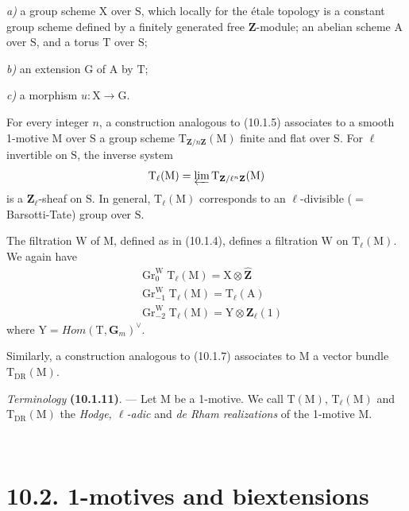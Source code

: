 \documentclass[11pt,leqno]{article}
\newcommand{\Page}[1]{\ifvmode\noindent\else\unskip\ \fi{\footnotesize\textcolor{gray}{[p.\,#1]}}\ \ignorespaces}
\begin{document}
\noindent \textit{a)} a group scheme \(\mathrm{X}\) over
\(\mathrm{S}\), which locally for the étale topology is a constant
group scheme defined by a finitely generated free \(\mathbf{Z}\)-module;
an abelian scheme \(\mathrm{A}\) over \(\mathrm{S}\), and a torus
\(\mathrm{T}\) over \(\mathrm{S}\);\par
\noindent \textit{b)} an extension \(\mathrm{G}\) of \(\mathrm{A}\)
by \(\mathrm{T}\);\par
\noindent \textit{c)} a morphism \(u:\mathrm{X}\to\mathrm{G}\).

For every integer \(n\), a construction analogous to (10.1.5) associates
to a smooth 1-motive \(\mathrm{M}\) over \(\mathrm{S}\) a group
scheme \(\mathrm{T}_{\mathbf{Z}/n\mathbf{Z}}(\mathrm{M})\) finite and
flat over \(\mathrm{S}\). For \(\ell\) invertible on \(\mathrm{S}\),
the inverse system
\[
\mathrm{T}_{\ell}(\mathrm{M})
=\varprojlim\mathrm{T}_{\mathbf{Z}/\ell^n\mathbf{Z}}(\mathrm{M})
\]
is a \(\mathbf{Z}_{\ell}\)-sheaf on \(\mathrm{S}\). In general,
\(\mathrm{T}_{\ell}(\mathrm{M})\) corresponds to an
\(\ell\)-divisible (\(=\) Barsotti-Tate) group over \(\mathrm{S}\).

The filtration \(\mathrm{W}\) of \(\mathrm{M}\), defined as in
(10.1.4), defines a filtration \(\mathrm{W}\) on
\(\mathrm{T}_{\ell}(\mathrm{M})\). We again have
\[
\begin{aligned}
&\operatorname{Gr}^{\mathrm{W}}_0\mathrm{T}_{\ell}(\mathrm{M})
  =\mathrm{X}\otimes\widehat{\mathbf{Z}}
\\
&\operatorname{Gr}^{\mathrm{W}}_{-1}\mathrm{T}_{\ell}(\mathrm{M})
  =\mathrm{T}_{\ell}(\mathrm{A})
\\
&\operatorname{Gr}^{\mathrm{W}}_{-2}\mathrm{T}_{\ell}(\mathrm{M})
  =\mathrm{Y}\otimes\mathbf{Z}_{\ell}(1)
\end{aligned}
\]
where \(\mathrm{Y}=\mathit{Hom}(\mathrm{T},\mathbf{G}_m)^{\vee}\).

Similarly, a construction analogous to (10.1.7) associates to \(\mathrm{M}\)
a vector bundle \(\mathrm{T}_{\mathrm{DR}}(\mathrm{M})\).

\textit{Terminology} \textbf{(10.1.11)}. —
Let \(\mathrm{M}\) be a 1-motive. We call \(\mathrm{T}(\mathrm{M})\),
\(\mathrm{T}_{\ell}(\mathrm{M})\) and
\(\mathrm{T}_{\mathrm{DR}}(\mathrm{M})\) the
\textit{Hodge, \(\ell\)-adic} and
\textit{de Rham realizations} of the 1-motive \(\mathrm{M}\).

\Page{60}
\section*{10.2. 1-motives and biextensions}
\end{document}
